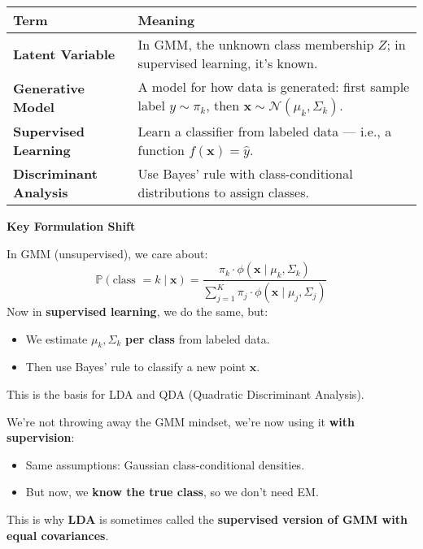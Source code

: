 \begin{table}[!htp]
    \centering
    \begin{tabular}{@{} l | p{20em} @{}}
        \toprule
        Term & Meaning \\
        \midrule
        \textbf{Latent Variable}       & In GMM, the unknown class membership $Z$; in supervised learning, it's known.                                              \\ [.5em]
        \textbf{Generative Model}      & A model for how data is generated: first sample label $y \sim \pi_k$, then $\mathbf{x} \sim \mathcal{N}(\mu_k, \Sigma_k)$. \\ [.5em]
        \textbf{Supervised Learning}   & Learn a classifier from labeled data — i.e., a function $f(\mathbf{x}) = \hat{y}$.                                         \\ [.5em]
        \textbf{Discriminant Analysis} & Use Bayes' rule with class-conditional distributions to assign classes.                                                    \\
        \bottomrule
    \end{tabular}
\end{table}

\newpage

\begin{flushleft}
    \textcolor{Green3}{ \textbf{Key Formulation Shift}}
\end{flushleft}
In GMM (unsupervised), we care about:
\begin{equation*}
    \mathbb{P}(\text{class } = k \mid \mathbf{x}) = \dfrac{
            \pi_k \cdot \phi\left(\mathbf{x} \mid \mu_k, \Sigma_k\right)
        }{
            \displaystyle\sum_{j=1}^K \pi_j \cdot \phi\left(\mathbf{x} \mid \mu_j, \Sigma_j\right)
        }
\end{equation*}
Now in \textbf{supervised learning}, we do the same, but:
\begin{itemize}
    \item We estimate $\mu_k, \Sigma_k$ \textbf{per class} from labeled data.
    \item Then use Bayes' rule to classify a new point $\mathbf{x}$.
\end{itemize}
This is the basis for LDA and QDA (Quadratic Discriminant Analysis).

\highspace
We're not throwing away the GMM mindset, we're now using it \textbf{with supervision}:
\begin{itemize}
    \item Same assumptions: Gaussian class-conditional densities.
    \item But now, we \textbf{know the true class}, so we don't need EM.
\end{itemize}
This is why \textbf{LDA} is sometimes called the \textbf{supervised version of GMM with equal covariances}.